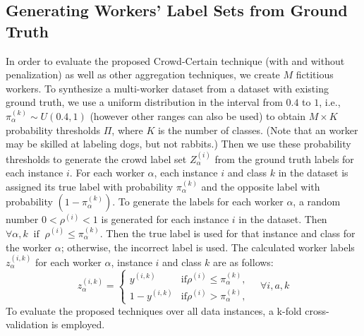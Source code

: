 \subsection{Generating Workers' Label Sets from Ground Truth}\label{subsec:methods.generating_fictitious_labelset}
In order to evaluate the proposed Crowd-Certain technique (with and without penalization) as well as other aggregation techniques, we create $M$ fictitious workers. To synthesize a multi-worker dataset from a dataset with existing ground truth, we use a uniform distribution in the interval from $0.4 $ to $1 $, i.e., $\pi_\alpha^{(k)} \sim U\left(0.4,1\right) $ (however other ranges can also be used) to obtain $M \times  K$ probability thresholds $\Pi $, where $K$ is the number of classes. (Note that
an worker may be skilled at labeling dogs, but not rabbits.) Then we use these probability thresholds to generate the crowd label set $Z_{\alpha}^{(i)} $ from the ground truth labels for each instance $i $.
For each worker $\alpha $, each instance $i $ and class $k $ in the dataset is assigned its true label with probability $\pi_\alpha^{(k)}$ and the opposite label with probability $ (1-\pi_\alpha^{(k)})$. To generate the labels for each worker $\alpha $, a random number $0 < \rho^{(i)} < 1 $ is generated for each instance $i $ in the dataset. Then $\forall \alpha,k \; \; \text{if} \; \; \rho^{(i)}\leq \pi_\alpha^{(k)}$. Then the true label is used for that instance and class for the worker $\alpha $; otherwise, the incorrect label is used.
The calculated worker labels $z_{\alpha}^{(i,k)} $ for each worker $\alpha $, instance $i $ and class $k $ are as follows:
\begin{equation}
    z_{\alpha}^{(i,k)} =
    \begin{cases}
        y^{(i,k)} & \text{if} \rho^{(i)}  \leq \pi_\alpha^{(k)} , \\
        1 - y^{(i,k)} & \text{if} \rho^{(i)} > \pi_\alpha^{(k)} ,
    \end{cases} \quad \forall i, a, k
    \label{eq:crowd.Eq.4.fictitious_label}
\end{equation}
To evaluate the proposed techniques over all data instances, a k-fold cross-validation is employed.
%
